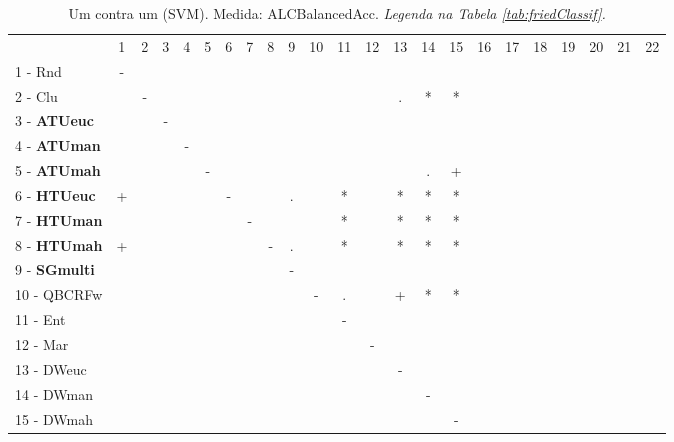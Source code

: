 \begin{table}[h]
\caption{Um contra um (SVM). Medida: ALCBalancedAcc. \textit{Legenda na Tabela \ref{tab:friedClassif}.}}
\begin{center}\begin{tabular}{lcc|cc|cc|cc|cc|cc|cc|cc|cc|cc|cc}
 			& 1 & 2 & 3 & 4 & 5 & 6 & 7 & 8 & 9 & 10 & 11 & 12 & 13 & 14 & 15 & 16 & 17 & 18 & 19 & 20 & 21 & 22\\
1 - Rnd  	& - &   &   &   &   &   &   &   &   &   &   &   &   &   &   &   &   &   &   &   &   &   \\
2 - Clu  	&   & - &   &   &   &   &   &   &   &   &   &   & . & * & * &   &   &   &   &   &   &   \\ \hline
3 - \textbf{ATUeuc}	&   &   & - &   &   &   &   &   &   &   &   &   &   &   &   &   &   &   &   &   &   &   \\
4 - \textbf{ATUman}	&   &   &   & - &   &   &   &   &   &   &   &   &   &   &   &   &   &   &   &   &   &   \\ \hline
5 - \textbf{ATUmah}	&   &   &   &   & - &   &   &   &   &   &   &   &   & . & + &   &   &   &   &   &   &   \\
6 - \textbf{HTUeuc}	& + &   &   &   &   & - &   &   & . &   & * &   & * & * & * &   &   &   &   &   &   &   \\ \hline
7 - \textbf{HTUman}	&   &   &   &   &   &   & - &   &   &   & * &   & * & * & * &   &   &   &   &   &   &   \\
8 - \textbf{HTUmah}	& + &   &   &   &   &   &   & - & . &   & * &   & * & * & * &   &   &   &   &   &   &   \\ \hline
9 - \textbf{SGmulti}	&   &   &   &   &   &   &   &   & - &   &   &   &   &   &   &   &   &   &   &   &   &   \\
10 - QBCRFw	&   &   &   &   &   &   &   &   &   & - & . &   & + & * & * &   &   &   &   &   &   &   \\ \hline
11 - Ent  	&   &   &   &   &   &   &   &   &   &   & - &   &   &   &   &   &   &   &   &   &   &   \\
12 - Mar  	&   &   &   &   &   &   &   &   &   &   &   & - &   &   &   &   &   &   &   &   &   &   \\ \hline
13 - DWeuc	&   &   &   &   &   &   &   &   &   &   &   &   & - &   &   &   &   &   &   &   &   &   \\
14 - DWman	&   &   &   &   &   &   &   &   &   &   &   &   &   & - &   &   &   &   &   &   &   &   \\ \hline
15 - DWmah	&   &   &   &   &   &   &   &   &   &   &   &   &   &   & - &   &   &   &   &   &   &   \\

\end{tabular}
\end{center}
\end{table}
